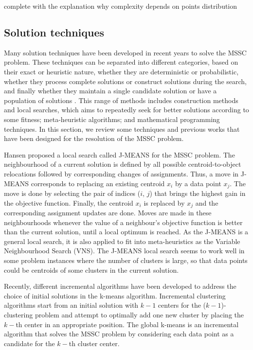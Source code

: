 \noindent [TO-DO] complete with the explanation why complexity depends on points distribution

\subsection{Solution techniques}
Many solution techniques have been developed in recent years to solve the MSSC problem. These techniques can be separated into different categories, based on their exact or heuristic nature, whether they are deterministic or probabilistic, whether they process complete solutions or construct solutions during the search, and finally whether they maintain a single candidate solution or have a population of solutions \cite{Das2009}. This range of methods includes construction methods and local searches, which aims to repeatedly seek for better solutions according to some fitness; meta-heuristic algorithms; and mathematical programming techniques. In this section, we review some techniques and previous works that have been designed for the resolution of the MSSC problem.

Hansen \cite{Hansen2001} proposed a local search called J-MEANS for the MSSC problem. The neighbourhood of a current solution is defined by all possible centroid-to-object relocations followed by corresponding changes of assignments. Thus, a move in J-MEANS corresponds to replacing an existing centroid $x_i$ by a data point $x_j$. The move is done by selecting the pair of indices ($i$, $j$) that brings the highest gain in the objective function. Finally, the centroid $x_i$ is replaced by $x_j$ and the corresponding assignment updates are done. Moves are made in these neighbourhoods whenever the value of a neighbour's objective function is better than the current solution, until a local optimum is reached. As the J-MEANS is a general local search, it is also applied to fit into meta-heuristics as the Variable Neighbourhood Search (VNS). The J-MEANS local search seems to work well in some problem instances where the number of clusters is large, so that data points could be centroids of some clusters in the current solution.

Recently, different incremental algorithms have been developed to address the choice of initial solutions in the k-means algorithm. Incremental clustering algorithms start from an initial solution with $k - 1$ centers for the ($k - 1$)-clustering problem and attempt to optimally add one new cluster by placing the $k-$th center in an appropriate position. The global k-means \cite{Likas2003} is an incremental algorithm that solves the MSSC problem by considering each data point as a candidate for the $k-$th cluster center.

